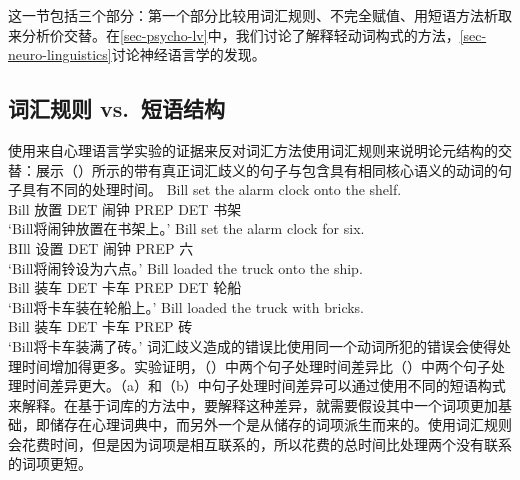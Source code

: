 \begin{exe}
\begin{xlist}[iv.]
\begin{exe}
\begin{xlist}[iv.]
这一节包括三个部分：第一个部分比较用词汇规则、不完全赋值、用短语方法析取来分析价交替。在\ref{sec-psycho-lv}中，我们讨论了解释轻动词构式的方法，\ref{sec-neuro-linguistics}讨论神经语言学的发现。

\subsection{词汇规则 vs.\ 短语结构}
\label{sec-lr-phrasal-psycho}
\mbox{}\citet[\S~1.4.5]{Goldberg95a}使用来自心理语言学实验的证据来反对词汇方法使用词汇规则来说明论元结构的交替：\citet{CT88a}展示（）所示的带有真正词汇歧义的句子与包含具有相同核心语义的动词的句子具有不同的处理时间。
\eal
\ex
\gll Bill set the alarm clock onto the shelf.\\
     Bill 放置 DET 闹钟 PREP DET 书架\\
\glt `Bill将闹钟放置在书架上。' 
\ex
\gll Bill set the alarm clock for six.\\
     BIll 设置 DET 闹钟 PREP 六\\
\glt `Bill将闹铃设为六点。' 
\zl
\eal
\ex
\gll Bill loaded the truck onto the ship.\\
     Bill 装车 DET 卡车 PREP DET 轮船\\
\glt `Bill将卡车装在轮船上。' 
\ex
\gll Bill loaded the truck with bricks.\\
     Bill 装车 DET 卡车 PREP 砖\\
\glt `Bill将卡车装满了砖。' 
\zl
词汇歧义造成的错误比使用同一个动词所犯的错误会使得处理时间增加得更多。实验证明，（）中两个句子处理时间差异比（）中两个句子处理时间差异更大。（a）和（b）中句子处理时间差异可以通过使用不同的短语构式来解释。在基于词库的方法中，要解释这种差异，就需要假设其中一个词项更加基础，即储存在心理词典中，而另外一个是从储存的词项派生而来的。使用词汇规则会花费时间，但是因为词项是相互联系的，所以花费的总时间比处理两个没有联系的词项更短\citep[]{Mueller2002b}。

\end{xlist}
\end{exe}
\end{xlist}
\end{exe}
